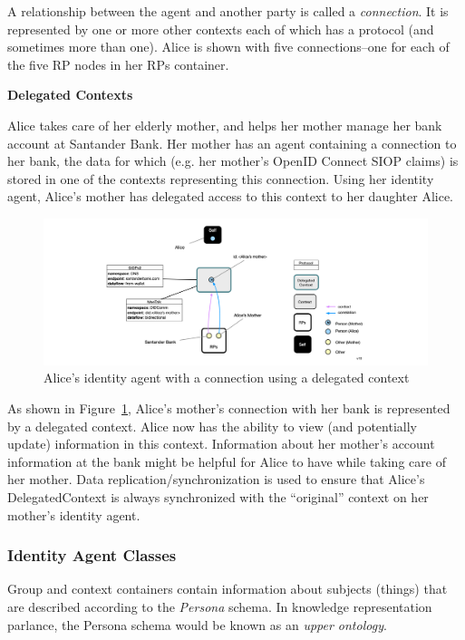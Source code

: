 \documentclass[11pt, oneside]{article}   	%
\begin{document}
A relationship between the agent and another party is called a \emph{connection}. It is represented by one or more other contexts each of which has a protocol (and sometimes more than one). Alice is shown with five connections--one for each of the five RP nodes in her RPs container. 

\textbf{Delegated Contexts}

Alice takes care of her elderly mother, and helps her mother manage her bank account at Santander Bank. Her mother has an agent containing a connection to her bank, the data for which (e.g. her mother's OpenID Connect SIOP claims) is stored in one of the contexts representing this connection. Using her identity agent, Alice's mother has delegated access to this context to her daughter Alice.

\begin{figure}[htbp]
\includegraphics[width=\textwidth]{./images/delegated-contexts.png}
\caption{Alice's identity agent with a connection using a delegated context}
\label{fig:delegated-contexts}
\end{figure}

As shown in Figure~\ref{fig:delegated-contexts}, Alice's mother's connection with her bank is represented by a delegated context. Alice now has the ability to view (and potentially update) information in this context. Information about her mother's account information at the bank might be helpful for Alice to have while taking care of her mother. Data replication/synchronization is used to ensure that Alice's DelegatedContext is always synchronized with the ``original'' context on her mother's identity agent.

\subsubsection{Identity Agent Classes}

Group and context containers contain information about subjects (things) that are described according to the \emph{Persona} schema. In knowledge representation parlance, the Persona schema would be known as an \emph{upper ontology}.
\end{document}
